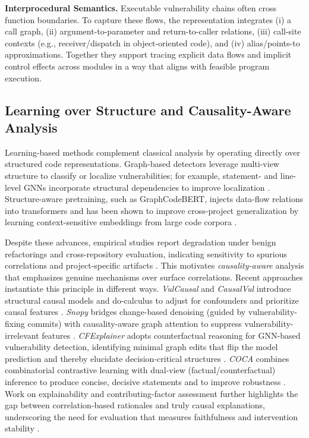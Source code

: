 \documentclass{buthesis}
\begin{document}
\textbf{Interprocedural Semantics.}
Executable vulnerability chains often cross function boundaries. To capture these flows, the representation integrates (i) a call graph, (ii) argument-to-parameter and return-to-caller relations, (iii) call-site contexts (e.g., receiver/dispatch in object-oriented code), and (iv) alias/points-to approximations. Together they support tracing explicit data flows and implicit control effects across modules in a way that aligns with feasible program execution.

\subsection{Learning over Structure and Causality-Aware Analysis}


Learning-based methods complement classical analysis by operating directly over structured code representations. Graph-based detectors leverage multi-view structure to classify or localize vulnerabilities; for example, statement- and line-level GNNs incorporate structural dependencies to improve localization \cite{hin2022linevd,Chakraborty2020}. Structure-aware pretraining, such as GraphCodeBERT, injects data-flow relations into transformers and has been shown to improve cross-project generalization by learning context-sensitive embeddings from large code corpora \cite{guo2021graphcodebert,fu2022linevul}. 

Despite these advances, empirical studies report degradation under benign refactorings and cross-repository evaluation, indicating sensitivity to spurious correlations and project-specific artifacts \cite{Li2022Empirical,yang2022natural}. This motivates \emph{causality-aware} analysis that emphasizes genuine mechanisms over surface correlations. Recent approaches instantiate this principle in different ways. \emph{VulCausal} and \emph{CausalVul} introduce structural causal models and do-calculus to adjust for confounders and prioritize causal features \cite{Kuang2024KSEM,Rahman2024ICSE}. \emph{Snopy} bridges change-based denoising (guided by vulnerability-fixing commits) with causality-aware graph attention to suppress vulnerability-irrelevant features \cite{Cao2024ASE}. \emph{CFExplainer} adopts counterfactual reasoning for GNN-based vulnerability detection, identifying minimal graph edits that flip the model prediction and thereby elucidate decision-critical structures \cite{Chu2024ISSTA}. \emph{COCA} combines combinatorial contrastive learning with dual-view (factual/counterfactual) inference to produce concise, decisive statements and to improve robustness \cite{Cao2024ICSE}. Work on explainability and contributing-factor assessment further highlights the gap between correlation-based rationales and truly causal explanations, underscoring the need for evaluation that measures faithfulness and intervention stability \cite{Allix2024,li2023xai,Moschitti2024}.
\end{document}
